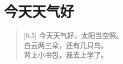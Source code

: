 \documentclass[12pt,UTF-8,openany]{ctexbook}
\begin{document}
\clearpage

\begin{center}
    
    
    
\end{center}


\hanzibox{}\hanzibox{}\hanzibox{}\hanzibox{}\hspace{1em}\hanzibox{}\hanzibox{}\hanzibox{}\hanzibox{}

\hanzibox{}\hanzibox{}\hanzibox{}\hanzibox{}\hspace{1em}\hanzibox{}\hanzibox{}\hanzibox{}\hanzibox{}

\hanzibox{}\hanzibox{}\hanzibox{}\hanzibox{}\hspace{1em}\hanzibox{}\hanzibox{}\hanzibox{}\hanzibox{}






\chapter{今天天气好}

\begin{large}
    
    \begin{verse}[0.5\linewidth]
        今天天气好，太阳当空照。 \\
        白云两三朵，还有几只鸟。 \\
        背上小书包，我去上学了。
    \end{verse}
    
\end{large}


\clearpage

\begin{center}
    
    
    
\end{center}


\hanzibox{}\hanzibox{}\hanzibox{}\hanzibox{}\hspace{1em}\hanzibox{}\hanzibox{}\hanzibox{}\hanzibox{}

\hanzibox{}\hanzibox{}\hanzibox{}\hanzibox{}\hspace{1em}\hanzibox{}\hanzibox{}\hanzibox{}\hanzibox{}
\end{document}
